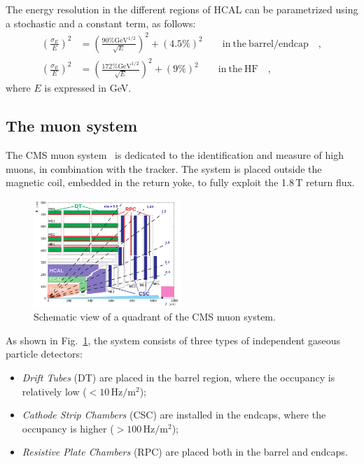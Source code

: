 The energy resolution in the different regions of HCAL can be parametrized using a stochastic and a constant term, as follows:
\begin{equation}
\begin{split}
\left(\frac{\sigma_E}{E}\right)^2 &= \left(\frac{90\% \mathrm{GeV}^{1/2}}{\sqrt{E}}\right)^2 + \left(4.5\%\right)^2 \qquad \mathrm{in~ the~ barrel/endcap}\quad,\\
\left(\frac{\sigma_E}{E}\right)^2 &= \left(\frac{172\% \mathrm{GeV}^{1/2}}{\sqrt{E}}\right)^2 + \left(9\%\right)^2 \qquad \mathrm{in~ the~ HF}\quad,
\end{split}
\end{equation}
where $E$ is expressed in GeV.


\subsection{The muon system}\label{sec:muonsyst}
The CMS muon system~\cite{muon} is dedicated to the identification and measure of high \pt muons, in combination with the tracker. The system is placed outside the magnetic coil, embedded in the return yoke, to fully exploit the 1.8\,T return flux.
\begin{figure}[htb]
\centering
\includegraphics[width=0.5\textwidth]{images/muonsyst.png}
\caption{Schematic view of a quadrant of the CMS muon system.}\label{fig:muonsyst}
\end{figure}
As shown in Fig.~\ref{fig:muonsyst}, the system consists of three types of independent gaseous particle detectors:
\begin{itemize}
\item \emph{Drift Tubes} (DT) are placed in the barrel region, where the occupancy is relatively low ($< 10\,\mathrm{Hz/m^2}$);
\item \emph{Cathode Strip Chambers} (CSC) are installed in the endcaps, where the occupancy is higher ($> 100\,\mathrm{Hz/m^2}$);
\item \emph{Resistive Plate Chambers} (RPC) are placed both in the barrel and endcaps.
\end{itemize}

